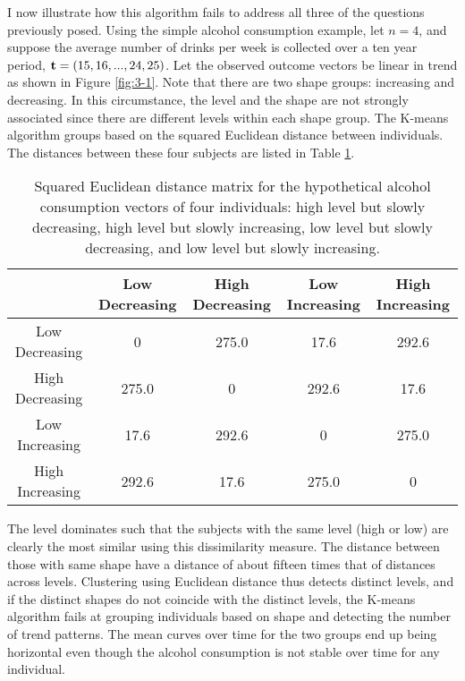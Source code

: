 I now illustrate how this algorithm fails to address all three of the questions previously posed. Using the simple alcohol consumption example, let $n=4$, and suppose the average number of drinks per week is collected over a ten year period, $\mathbf t=(15,16,...,24,25)$. Let the observed outcome vectors be linear in trend as shown in Figure \ref{fig:3-1}. Note that there are two shape groups: increasing and decreasing. In this circumstance, the level and the shape are not strongly associated since there are different levels within each shape group. The K-means algorithm groups based on the squared Euclidean distance between individuals. The distances between these four subjects are listed in Table \ref{tab:3-1}. 
\begin{table}[ht]
\centering
\begin{tabular}{c|cccc}
&Low Decreasing& High Decreasing&Low Increasing&High Increasing\\
\hline
Low Decreasing&0&275.0&17.6&292.6\\
High Decreasing&275.0  &0 &  292.6 &17.6 \\                     
Low Increasing& 17.6 &292.6  &0   &275.0   \\          
High Increasing& 292.6 &17.6 &275.0   &0 
\end{tabular}
\caption{Squared Euclidean distance matrix for the hypothetical alcohol consumption vectors of four individuals: high level but slowly decreasing, high level but slowly increasing, low level but slowly decreasing, and low level but slowly increasing. }
\label{tab:3-1}
\end{table}

The level dominates such that the subjects with the same level (high or low) are clearly the most similar using this dissimilarity measure. The distance between those with same shape have a distance of about fifteen times that of distances across levels. Clustering using Euclidean distance thus detects distinct levels, and if the distinct shapes do not coincide with the distinct levels, the K-means algorithm fails at grouping individuals based on shape and detecting the number of trend patterns. The mean curves over time for the two groups end up being horizontal even though the alcohol consumption is not stable over time for any individual.

